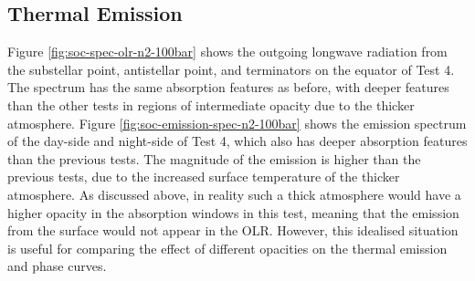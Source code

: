 %
%
%
%
%



\subsection{Thermal Emission}

Figure \ref{fig:soc-spec-olr-n2-100bar} shows the outgoing longwave radiation from the substellar point, antistellar point, and terminators on the equator of Test 4. The spectrum has the same absorption features as before, with deeper features than the other tests in regions of intermediate opacity due to the thicker atmosphere. Figure \ref{fig:soc-emission-spec-n2-100bar} shows the emission spectrum of the day-side and night-side of Test 4, which also has deeper absorption features than the previous tests.  The magnitude of the emission is higher than the previous tests, due to the increased surface temperature of the thicker atmosphere. As discussed above,  in reality such a thick atmosphere would have a higher opacity in the absorption windows in this test, meaning that the emission from the surface would not appear in the OLR. However, this idealised situation is useful for comparing the effect of different opacities on the thermal emission and phase curves.





